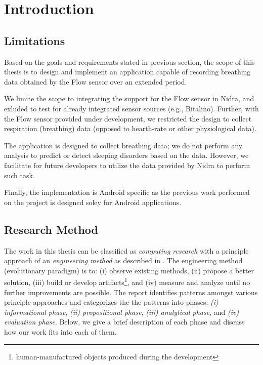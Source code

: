 \chapter{Introduction}\label{introduction}




\section{Limitations}
Based on the goals and requirements stated in previous section, the scope of this thesis is to design and implement an application capable of recording breathing data obtained by the Flow sensor over an extended period. 

We limite the scope to integrating the support for the Flow sensor in Nidra, and exluded to test for already integrated sensor sources (e.g., Bitalino). Further, with the Flow sensor provided under development, we restricted the design to collect respiration (breathing) data (opposed to hearth-rate or other physiological data).

The application is designed to collect breathing data; we do not perform any analysis to predict or detect sleeping disorders based on the data. However, we facilitate for future developers to utilize the data provided by Nidra to perform such task.

Finally, the implementation is Android specific as the previous work performed on the project is designed soley for Android applications. 

\section{Research Method}
The work in this thesis can be classified as \textit{computing research} with a principle approach of an \textit{engineering method} as described in \cite{Glass_1995}. The engineering method (evolutionary paradigm) is to: (i) observe existing methods, (ii) propose a better solution, (iii)  build or develop artifacts\footnote{human-manufactured objects produced during the development}, and (iv) measure and analyze until no further improvements are possible. The report identifies patterns amongst various principle approaches and categorizes the the patterns into phases: \textit{(i) informational phase}, \textit{(ii) propositional phase}, \textit{(iii) analytical phase}, and \textit{(iv) evaluation phase}. Below, we give a brief description of each phase and discuss how our work fits into each of them. 

